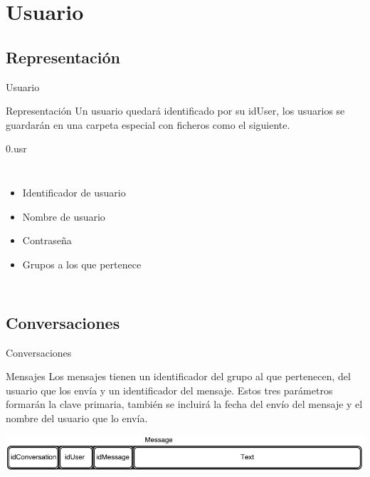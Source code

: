 \section{Usuario}
\subsection{Representación}

\begin{frame}{Usuario}
	\begin{block}{Representación}
		Un usuario quedará identificado por su idUser, los usuarios se guardarán en una carpeta especial con
		ficheros como el siguiente.
	\end{block}
	
	\begin{exampleblock}{0.usr}
	\begin{columns}
		
		
		\begin{itemize}
			\item Identificador de usuario
			\item Nombre de usuario
			\item Contraseña
			\item Grupos a los que pertenece
		\end{itemize}	
	\end{columns}
	\end{exampleblock}
\end{frame}



\subsection{Conversaciones}
\begin{frame}{Conversaciones}
	\begin{block}{Mensajes}
	Los mensajes tienen un identificador del grupo al que pertenecen, del usuario que los envía y un identificador del mensaje. Estos tres parámetros formarán la clave primaria, también se incluirá la fecha del envío del mensaje y el nombre del usuario que lo envía.
	\end{block}
	
	\begin{exampleblock}{ }
		\includegraphics[scale=0.43]{./Imagenes/message.png}
	\end{exampleblock}
\end{frame}


